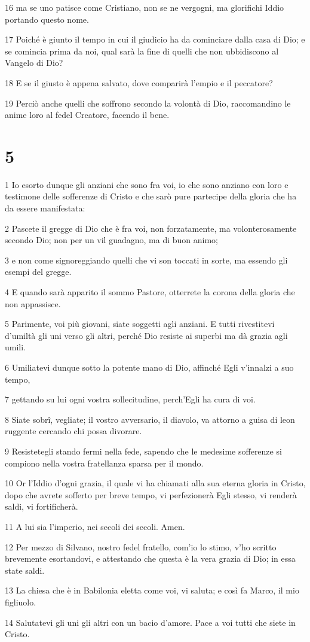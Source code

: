 \par 16 ma se uno patisce come Cristiano, non se ne vergogni, ma glorifichi Iddio portando questo nome.
\par 17 Poiché è giunto il tempo in cui il giudicio ha da cominciare dalla casa di Dio; e se comincia prima da noi, qual sarà la fine di quelli che non ubbidiscono al Vangelo di Dio?
\par 18 E se il giusto è appena salvato, dove comparirà l'empio e il peccatore?
\par 19 Perciò anche quelli che soffrono secondo la volontà di Dio, raccomandino le anime loro al fedel Creatore, facendo il bene.

\chapter{5}

\par 1 Io esorto dunque gli anziani che sono fra voi, io che sono anziano con loro e testimone delle sofferenze di Cristo e che sarò pure partecipe della gloria che ha da essere manifestata:
\par 2 Pascete il gregge di Dio che è fra voi, non forzatamente, ma volonterosamente secondo Dio; non per un vil guadagno, ma di buon animo;
\par 3 e non come signoreggiando quelli che vi son toccati in sorte, ma essendo gli esempi del gregge.
\par 4 E quando sarà apparito il sommo Pastore, otterrete la corona della gloria che non appassisce.
\par 5 Parimente, voi più giovani, siate soggetti agli anziani. E tutti rivestitevi d'umiltà gli uni verso gli altri, perché Dio resiste ai superbi ma dà grazia agli umili.
\par 6 Umiliatevi dunque sotto la potente mano di Dio, affinché Egli v'innalzi a suo tempo,
\par 7 gettando su lui ogni vostra sollecitudine, perch'Egli ha cura di voi.
\par 8 Siate sobrî, vegliate; il vostro avversario, il diavolo, va attorno a guisa di leon ruggente cercando chi possa divorare.
\par 9 Resistetegli stando fermi nella fede, sapendo che le medesime sofferenze si compiono nella vostra fratellanza sparsa per il mondo.
\par 10 Or l'Iddio d'ogni grazia, il quale vi ha chiamati alla sua eterna gloria in Cristo, dopo che avrete sofferto per breve tempo, vi perfezionerà Egli stesso, vi renderà saldi, vi fortificherà.
\par 11 A lui sia l'imperio, nei secoli dei secoli. Amen.
\par 12 Per mezzo di Silvano, nostro fedel fratello, com'io lo stimo, v'ho scritto brevemente esortandovi, e attestando che questa è la vera grazia di Dio; in essa state saldi.
\par 13 La chiesa che è in Babilonia eletta come voi, vi saluta; e così fa Marco, il mio figliuolo.
\par 14 Salutatevi gli uni gli altri con un bacio d'amore. Pace a voi tutti che siete in Cristo.


